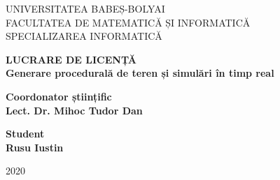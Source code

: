 \documentclass[a4paper, 12pt]{report}
\def\blankpage{%
      \clearpage%
      \thispagestyle{empty}%
      \addtocounter{page}{-1}%
      \null%
      \clearpage}
\begin{document}
\blankpage

\begin{titlepage}

\sloppy

\begin{center}

\Large{UNIVERSITATEA BABEȘ-BOLYAI}\\
\vspace{0.2cm}
\Large{FACULTATEA DE MATEMATICĂ ȘI INFORMATICĂ}\\
\vspace{0.2cm}
\Large{SPECIALIZAREA INFORMATICĂ}\\

\end{center}

\vspace{2.5 cm}

\begin{center}

\Huge \textbf{LUCRARE DE LICENȚĂ}\\
\vspace{1 cm}
\huge \textbf{Generare procedurală de teren și simulări în timp real}

\end{center}

\vspace{2.5cm}

\begin{flushleft}

\Large{\textbf{Coordonator științific}}\\
\Large{\textbf{Lect. Dr. Mihoc Tudor Dan}}

\end{flushleft}

\vspace{0.5cm}

\begin{flushright}

\Large{\textbf{Student}}\\
\Large{\textbf{Rusu Iustin}}

\end{flushright}

\vspace*{\fill}

\begin{center}

\Large{2020}

\end{center}

\end{titlepage}

\blankpage



\lhead{}

\tableofcontents

\listoffigures

\listoftables













\end{document}
